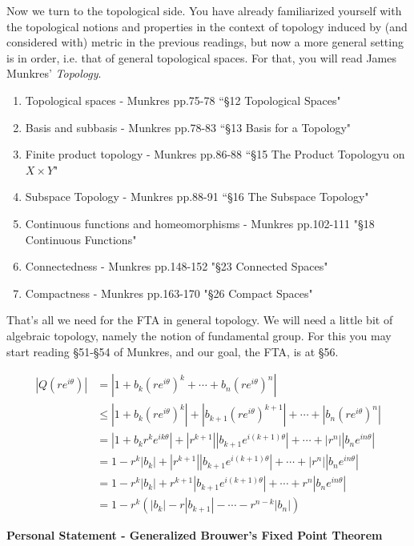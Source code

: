\documentclass[10pt]{article}
\begin{document}
Now we turn to the topological side. You have already familiarized yourself with the topological notions and properties in the context of topology induced by (and considered with) metric in the previous readings, but now a more general setting is in order, i.e. that of general topological spaces. For that, you will read James Munkres' \textit{Topology}.

\begin{enumerate}[label=\arabic*.]
\item Topological spaces - Munkres pp.75-78 ``\S12 Topological Spaces"
\item Basis and subbasis - Munkres pp.78-83 ``\S13 Basis for a Topology"
\item Finite product topology - Munkres pp.86-88 ``\S15 The Product Topologyu on $X\times Y$"
\item Subspace Topology - Munkres pp.88-91 ``\S16 The Subspace Topology"
\item Continuous functions and homeomorphisms - Munkres pp.102-111 "\S18 Continuous Functions"
\item Connectedness - Munkres pp.148-152 "\S23 Connected Spaces"
\item Compactness - Munkres pp.163-170 "\S26 Compact Spaces"
\end{enumerate}

That's all we need for the FTA in general topology. We will need a little bit of algebraic topology, namely the notion of fundamental group. For this you may start reading \S51-\S54 of Munkres, and our goal, the FTA, is at \S56.

$$
\begin{aligned}
|Q(re^{i\theta})|&=|1+b_{k} (re^{i\theta})^{k}+\cdots+b_{n} (re^{i\theta})^{n}|\\
&\leq|1+b_{k} (re^{i\theta})^{k}|+|b_{k+1} (re^{i\theta})^{k+1}|+\cdots+|b_{n} (re^{i\theta})^{n}|\\&=|1+b_{k} r^ke^{ik\theta}|+|r^{k+1}||b_{k+1} e^{i(k+1)\theta}|+\cdots+|r^n||b_{n} e^{in\theta}|\\&=1-r^k|b_k|+|r^{k+1}||b_{k+1} e^{i(k+1)\theta}|+\cdots+|r^n||b_{n} e^{in\theta}|\\&=1-r^k|b_k|+r^{k+1}|b_{k+1} e^{i(k+1)\theta}|+\cdots+r^n|b_{n} e^{in\theta}|\\&=1-r^{k}\left(\left|b_{k}\right|-r\left|b_{k+1}\right|-\cdots-r^{n-k}\left|b_{n}\right|\right)
\end{aligned}
$$

\newpage
\begin{center}\textbf{\Large Personal Statement - Generalized Brouwer's Fixed Point Theorem}\end{center}
\end{document}
